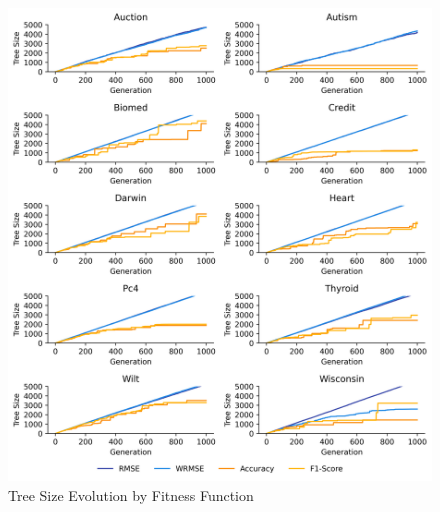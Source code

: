 
    \begin{figure}[H]
    \centering
    \includegraphics[width=\linewidth]{../Latex/Chapters/Figures/Results/fitness_tree_size_evolution.png}
    \caption{Tree Size Evolution by Fitness Function}
    \label{fig:fitness_tree_size_evolution}
    \end{figure}
    